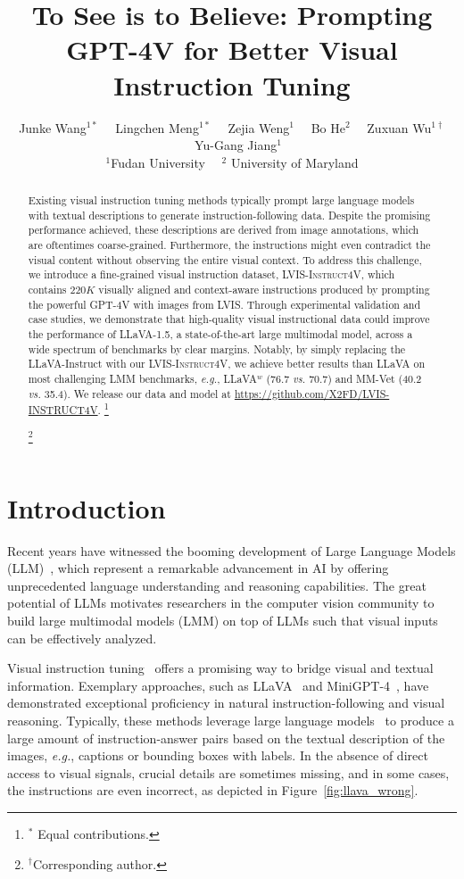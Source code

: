 \documentclass{article}
\title{To See is to Believe: Prompting GPT-4V for Better Visual Instruction Tuning}
\author{Junke Wang$^{1*}$ \ \ 
Lingchen Meng$^{1*}$ \ \ 
Zejia Weng$^{1}$ \ \  
Bo He$^{2}$ \ \ 
Zuxuan Wu$^{1\dagger}$ \ \  
Yu-Gang Jiang$^{1}$ \vspace{0.1in}\\
{$^1$Fudan University} \ \ {$^2$ University of Maryland} 
}
\makeatletter
\newcommand\blfootnote[1]{\begingroup
  \renewcommand\thefootnote{}\footnote{#1}\addtocounter{footnote}{-1}\endgroup
}
\newcommand{\dataname}{\textsc{LVIS-Instruct4V}\xspace}
\newcommand*{\eg}{\emph{e.g.}\@\xspace}
\newcommand*{\vs}{\emph{vs.}\@\xspace}
\makeatother
\begin{document}
\maketitle
\begin{abstract}
Existing visual instruction tuning methods typically prompt large language models with textual descriptions to generate instruction-following data. Despite the promising performance achieved, these descriptions are derived from image annotations, which are oftentimes coarse-grained. Furthermore, the instructions might even contradict the visual content without observing the entire visual context. To address this challenge, we introduce a fine-grained visual instruction dataset, \dataname, which contains $220K$ visually aligned and context-aware instructions produced by prompting the powerful GPT-4V with images from LVIS. 
Through experimental validation and case studies, we demonstrate that high-quality visual instructional data could improve the performance of LLaVA-1.5, a state-of-the-art large multimodal model, across a wide spectrum of benchmarks by clear margins. Notably, by simply replacing the LLaVA-Instruct with our \dataname, we achieve better results than LLaVA on most challenging LMM benchmarks, \eg, LLaVA$^w$ (76.7 \vs 70.7) and MM-Vet (40.2 \vs 35.4). We release our data and model at \url{https://github.com/X2FD/LVIS-INSTRUCT4V}.
\blfootnote{$^{*}$ Equal contributions.}
\blfootnote{$^{\dagger}$Corresponding author.}
\end{abstract}


 \section{Introduction}
\label{sec:intro}
Recent years have witnessed the booming development of Large Language Models (LLM)~\cite{brown2020language,zhang2022opt,touvron2023llama,touvron2023llama2}, which represent a remarkable advancement in AI by offering unprecedented language understanding and reasoning capabilities. The great potential of LLMs motivates researchers in the computer vision community to build large multimodal models (LMM) on top of LLMs such that visual inputs can be effectively analyzed.


Visual instruction tuning~\cite{liu2023visual} offers a promising way to bridge visual and textual information. Exemplary approaches, such as LLaVA~\cite{li2023llava,liu2023improved} and MiniGPT-4~\cite{zhu2023minigpt}, have demonstrated exceptional proficiency in natural instruction-following and visual reasoning. Typically, these methods leverage large language models~\cite{chatgpt,gpt4} to produce a large amount of instruction-answer pairs based on the textual description of the images, \eg, captions or bounding boxes with labels. In the absence of direct access to visual signals, crucial details are sometimes missing, and in some cases, the instructions are even incorrect, as depicted in Figure~\ref{fig:llava_wrong}.
\end{document}
